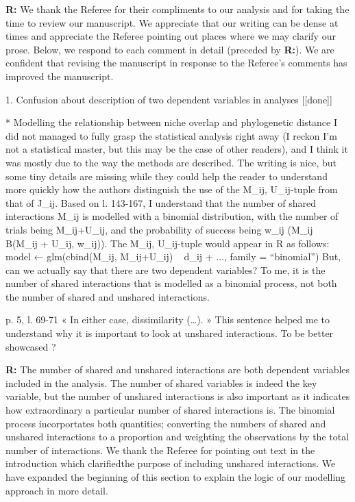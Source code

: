 \documentclass[12pt]{letter}
\newenvironment{refquote}{\bigskip \begin{it}}{\end{it}\smallskip}
\begin{document}
	\textbf{R:} We thank the Referee for their compliments to our analysis and for taking the time to review our manuscript. We appreciate that our writing can be dense at times and appreciate the Referee pointing out places where we may clarify our prose. Below, we respond to each comment in detail (preceded by \textbf{R:}). We are confident that revising the manuscript in response to the Referee's comments has improved the manuscript.


1. Confusion about description of two dependent variables in analyses [[done]]

	\begin{refquote}
		* Modelling the relationship between niche overlap and phylogenetic distance
		I did not managed to fully grasp the statistical analysis right away (I reckon I'm not a statistical master, but this may be the case of other readers), and I think it was mostly due to the way the methods are described. The writing is nice, but some tiny details are missing while they could help the reader to understand more quickly how the authors distinguish the use of the {M_ij, U_ij}-tuple from that of J_ij.
		Based on l. 143-167, I understand that the number of shared interactions M_ij is modelled with a binomial distribution, with the number of trials being M_ij+U_ij, and the probability of success being w_ij (M_ij ~ B(M_ij + U_ij, w_ij)). The {M_ij, U_ij}-tuple would appear in R as follows:
		model ← glm(cbind(M_ij, M_ij+U_ij) ~ d_ij + ..., family = “binomial”)
		But, can we actually say that there are two dependent variables? To me, it is the number of shared interactions that is modelled as a binomial process, not both the number of shared and unshared interactions.

		\smallskip

		p. 5, l. 69-71 « In either case, dissimilarity (…). » This sentence helped me to understand why it is important to look at unshared interactions. To be better showcased ?

	\end{refquote}


	\textbf{R:} The number of shared and unshared interactions are both dependent variables included in the analysis. The number of shared variables is indeed the key variable, but the number of unshared interactions is also important as it indicates how extraordinary a particular number of shared interactions is. The binomial process incorportates both quantities; converting the numbers of shared and unshared interactions to a proportion and weighting the observations by the total number of interactions. We thank the Referee for pointing out text in the introduction which clarifiedthe purpose of including unshared interactions. We have expanded the beginning of this section to explain the logic of our modelling approach in more detail.
\end{document}
